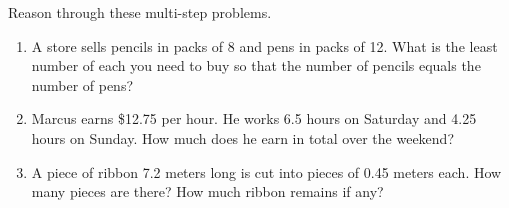 \documentclass[12pt, letterpaper, fleqn]{article}
\begin{document}
\noindent
Reason through these multi-step problems.

\vspace{3mm}
\begin{enumerate}[itemsep=2.4cm, leftmargin=0.6cm]
\item A store sells pencils in packs of 8 and pens in packs of 12. What is the least number of each you need to buy so that the number of pencils equals the number of pens?

\vspace{2.3cm}

\item Marcus earns \$12.75 per hour. He works 6.5 hours on Saturday and 4.25 hours on Sunday. How much does he earn in total over the weekend?

\vspace{2.3cm}

\item A piece of ribbon 7.2 meters long is cut into pieces of 0.45 meters each. How many pieces are there? How much ribbon remains if any?

\vspace{2.5cm}

\end{enumerate}
\end{document}
